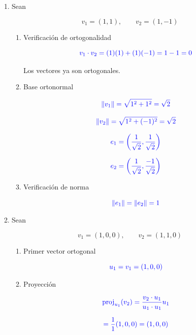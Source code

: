 \documentclass[12pt,letterpaper]{article}
\newcommand{\respuesta}[1]{
\[
\textcolor{blue}{#1}
\]
}
\begin{document}
\begin{enumerate}[label=\textbf{\arabic*.}]
\item Sean

\[
v_1=(1,1),
\qquad
v_2=(1,-1)
\]

\begin{enumerate}[label=\alph*)]

\item Verificación de ortogonalidad

\respuesta{
v_1\cdot v_2=(1)(1)+(1)(-1)=1-1=0
}

Los vectores ya son ortogonales.

\item Base ortonormal

\respuesta{
\|v_1\|=\sqrt{1^2+1^2}=\sqrt2
}

\respuesta{
\|v_2\|=\sqrt{1^2+(-1)^2}=\sqrt2
}

\respuesta{
e_1=
\left(
\frac1{\sqrt2},
\frac1{\sqrt2}
\right)
}

\respuesta{
e_2=
\left(
\frac1{\sqrt2},
\frac{-1}{\sqrt2}
\right)
}

\item Verificación de norma

\respuesta{
\|e_1\|=\|e_2\|=1
}

\end{enumerate}

\vspace{0.5cm}


\item Sean

\[
v_1=(1,0,0),
\qquad
v_2=(1,1,0)
\]

\begin{enumerate}[label=\alph*)]

\item Primer vector ortogonal

\respuesta{
u_1=v_1=(1,0,0)
}

\item Proyección

\respuesta{
\operatorname{proj}_{u_1}(v_2)
=
\frac{v_2\cdot u_1}{u_1\cdot u_1}u_1
}

\respuesta{
=
\frac{1}{1}(1,0,0)
=(1,0,0)
}


\end{enumerate}
\end{enumerate}
\end{document}
